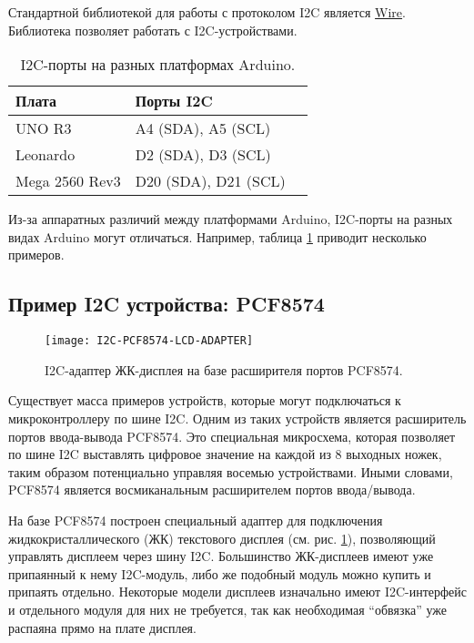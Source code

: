 \documentclass[../sparc.tex]{subfiles}
\begin{document}
Стандартной библиотекой для работы с протоколом I2C является
\href{https://www.arduino.cc/reference/en/language/functions/communication/wire/}{Wire}.
Библиотека позволяет работать с I2C-устройствами.

\begin{table}[h]
  \centering
  \begin{tabular}{ | m{5em} | m{1cm}| m{1cm} | }
    \hline
    Плата & Порты I2C \\
    \hline
    UNO R3 & A4 (SDA), A5 (SCL) \\
    \hline
    Leonardo & D2 (SDA), D3 (SCL) \\
    \hline
    Mega 2560 Rev3 & D20 (SDA), D21 (SCL) \\
    \hline
  \end{tabular}
  \caption{I2C-порты на разных платформах Arduino.}
  \label{table:i2c-pins}
\end{table}

Из-за аппаратных различий между платформами Arduino, I2C-порты на разных видах
Arduino могут отличаться. Например, таблица \ref{table:i2c-pins} приводит
несколько примеров.

\subsection{Пример I2C устройства: PCF8574}

\begin{figure}[H]
  \centering
  \texttt{[image: I2C-PCF8574-LCD-ADAPTER]}
  \caption{I2C-адаптер ЖК-дисплея на базе расширителя портов PCF8574.}
  \label{fig:i2c-pcf8574-lcd-adapter}
\end{figure}

Существует масса примеров устройств, которые могут подключаться к
микроконтроллеру по шине \gls{I2C}.  Одним из таких устройств является
расширитель портов ввода-вывода PCF8574.  Это специальная микросхема, которая
позволяет по шине I2C выставлять цифровое значение на каждой из 8 выходных
ножек, таким образом потенциально управляя восемью устройствами.  Иными словами,
PCF8574 является восмиканальным расширителем портов ввода/вывода.

На базе PCF8574 построен специальный адаптер для подключения
жидкокристаллического (ЖК) текстового дисплея
(см. рис. \ref{fig:i2c-pcf8574-lcd-adapter}), позволяющий управлять дисплеем
через шину I2C.  Большинство ЖК-дисплеев имеют уже припаянный к нему I2C-модуль,
либо же подобный модуль можно купить и припаять отдельно.  Некоторые модели
дисплеев изначально имеют I2C-интерфейс и отдельного модуля для них не
требуется, так как необходимая ``обвязка'' уже распаяна прямо на плате дисплея.
\end{document}
